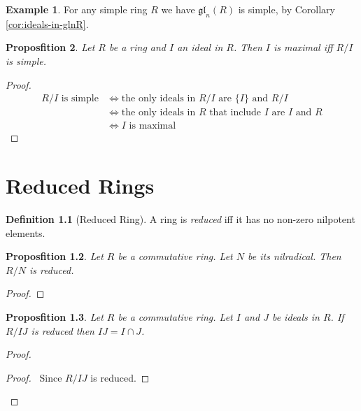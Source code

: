 \documentclass{book}
\let\qed\relax
\newtheorem{prop}{Proposfition}[chapter]
\theoremstyle{definition}
\newtheorem{df}[prop]{Definition}
\newtheorem{ex}[prop]{Example}
\newcommand{\gl}[2]{\ensuremath{\mathfrak{gl}_{#1} \left( {#2} \right)}}
\begin{document}
\begin{ex}
For any simple ring $R$ we have $\gl{n}{R}$ is simple, by Corollary \ref{cor:ideals-in-glnR}.
\end{ex}

\begin{prop}
\label{prop:maximal-iff-quotient-simple}
Let $R$ be a ring and $I$ an ideal in $R$. Then $I$ is maximal iff $R/I$ is simple.
\end{prop}

\begin{proof}
\pf
\begin{align*}
R / I \text{ is simple}
& \Leftrightarrow \text{the only ideals in } R / I \text{ are } \{I\} \text{ and } R / I \\
& \Leftrightarrow \text{the only ideals in } R \text{ that include } I \text{ are } I \text{ and } R \\
& \Leftrightarrow I \text{ is maximal}
\end{align*}
\qed
\end{proof}

\chapter{Reduced Rings}

\begin{df}[Reduced Ring]
A ring is \emph{reduced} iff it has no non-zero nilpotent elements.
\end{df}

\begin{prop}
Let $R$ be a commutative ring. Let $N$ be its nilradical. Then $R/N$ is reduced.
\end{prop}

\begin{proof}
\pf
{}
\qed
\end{proof}

\begin{prop}
Let $R$ be a commutative ring. Let $I$ and $J$ be ideals in $R$. If $R/IJ$ is reduced then $IJ = I \cap J$.
\end{prop}

\begin{proof}
\pf
{}
\begin{proof}
	\pf\ Since $R/IJ$ is reduced.
\end{proof}
\qed
\end{proof}
\end{document}
